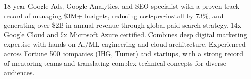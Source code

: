 \documentclass[11pt,a4paper,sans]{moderncv}
\begin{document}
\makecvtitle


\vspace{6pt}
\small{18-year Google Ads, Google Analytics, and SEO specialist with a proven track record of managing \$3M+ budgets, reducing cost-per-install by 73\%, and generating over \$2B in annual revenue through global paid search strategy. 14x Google Cloud and 9x Microsoft Azure certified. Combines deep digital marketing expertise with hands-on AI/ML engineering and cloud architecture. Experienced across Fortune 500 companies (IHG, Turner) and startups, with a strong record of mentoring teams and translating complex technical concepts for diverse audiences.}

\end{document}
